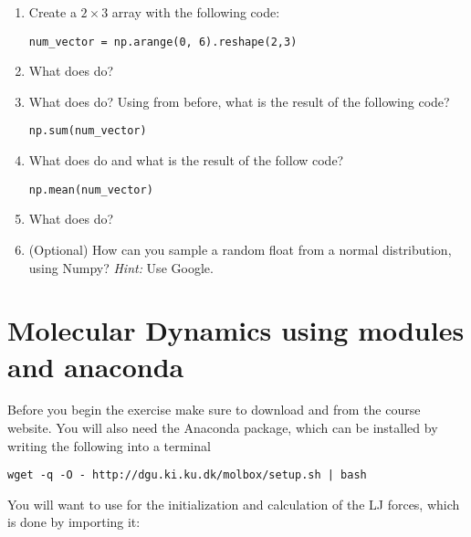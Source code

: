 \documentclass{article}
\begin{document}
\begin{enumerate}[resume]
   \item Create a $2\times 3$ array with the following code:

\begin{lstlisting}
num_vector = np.arange(0, 6).reshape(2,3)
\end{lstlisting}

   \item What does  do?

   \item What does  do? Using  from before, what is the result of the following code?

\begin{lstlisting}
np.sum(num_vector)
\end{lstlisting}


   \item What does  do and what is the result of the follow code?

\begin{lstlisting}
np.mean(num_vector)
\end{lstlisting}

   \item What does  do?

   \item (Optional) How can you sample a random float from a normal distribution, using Numpy? \newline
       {\em Hint:} Use Google.

\end{enumerate}


\newpage


\section{Molecular Dynamics using modules and anaconda}

Before you begin the exercise make sure to download  and  from the course website.
You will also need the Anaconda package, which can be installed by writing the following into a terminal
\begin{lstlisting}
wget -q -O - http://dgu.ki.ku.dk/molbox/setup.sh | bash
\end{lstlisting}

You will want to use  for the initialization and calculation of the LJ forces, which is done by importing it:
\end{document}
